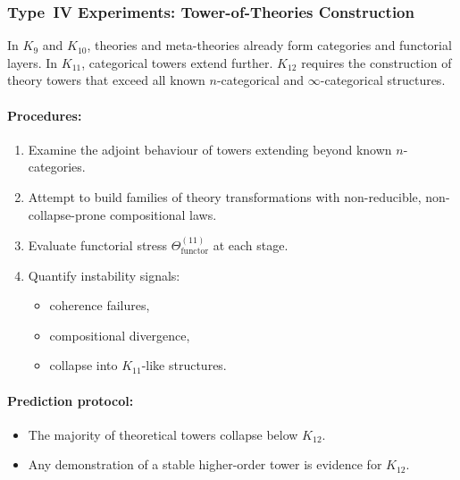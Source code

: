 \subsubsection{Type~IV Experiments: Tower-of-Theories Construction}

In $K_{9}$ and $K_{10}$, theories and meta-theories already form
categories and functorial layers.
In $K_{11}$, categorical towers extend further.
$K_{12}$ requires the construction of theory towers that exceed all
known $n$-categorical and $\infty$-categorical structures.

\paragraph{Procedures:}

\begin{enumerate}
    \item Examine the adjoint behaviour of towers extending beyond
          known $n$-categories.
    \item Attempt to build families of theory transformations with
          non-reducible, non-collapse-prone compositional laws.
    \item Evaluate functorial stress
          $\Theta_{\mathrm{functor}}^{(11)}$ at each stage.
    \item Quantify instability signals:
          \begin{itemize}
              \item coherence failures,
              \item compositional divergence,
              \item collapse into $K_{11}$-like structures.
          \end{itemize}
\end{enumerate}

\paragraph{Prediction protocol:}

\begin{itemize}
    \item The majority of theoretical towers collapse below $K_{12}$.
    \item Any demonstration of a stable higher-order tower is evidence
          for $K_{12}$.
\end{itemize}



